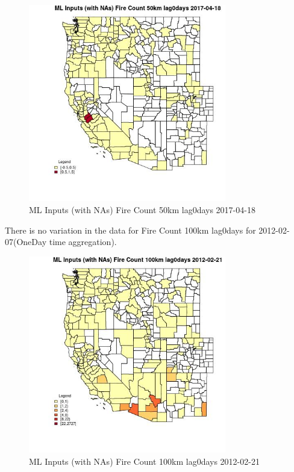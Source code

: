 \begin{figure} 
\centering  
\includegraphics[width=0.77\textwidth]{Code_Outputs/Report_ML_input_PM25_Step4_part_f_de_duplicated_aveswNAs_CountyFire_Count_50km_lag0daysMean2017-04-18.jpg} 
\caption{\label{fig:Report_ML_input_PM25_Step4_part_f_de_duplicated_aveswNAsCountyFire_Count_50km_lag0daysMean2017-04-18}ML Inputs (with NAs) Fire Count 50km lag0days 2017-04-18} 
\end{figure} 
 

There is no variation in the data for Fire Count 100km lag0days for 2012-02-07(OneDay time aggregation). 
 

\begin{figure} 
\centering  
\includegraphics[width=0.77\textwidth]{Code_Outputs/Report_ML_input_PM25_Step4_part_f_de_duplicated_aveswNAs_CountyFire_Count_100km_lag0daysMean2012-02-21.jpg} 
\caption{\label{fig:Report_ML_input_PM25_Step4_part_f_de_duplicated_aveswNAsCountyFire_Count_100km_lag0daysMean2012-02-21}ML Inputs (with NAs) Fire Count 100km lag0days 2012-02-21} 
\end{figure} 
 


